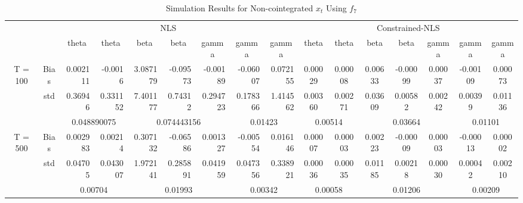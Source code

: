 \documentclass[a4paper,12pt,times,numbered,print,index]{report}
\numberwithin{equation}{section}
\begin{document}
\begin{table}[htbp]
	\centering
	\caption{Simulation Results for Non-cointegrated $x_t$ Using $f_7$}
	\begin{adjustbox}{max width=\textwidth}
	\begin{tabular}{cccccccccccccccc}
		\toprule
		& \multicolumn{8}{c}{NLS}                                       & \multicolumn{7}{c}{Constrained-NLS} \\
		&       & theta & theta & beta  & beta  & gamma & gamma & gamma & theta & theta & beta  & beta  & gamma & gamma & gamma \\
		\midrule
		\multirow{3}[1]{*}{T = 100} & Bias  & \multicolumn{1}{r}{0.002111} & \multicolumn{1}{r}{-0.0016} & \multicolumn{1}{r}{3.087179} & \multicolumn{1}{r}{-0.09573} & \multicolumn{1}{r}{-0.00189} & \multicolumn{1}{r}{-0.06007} & \multicolumn{1}{r}{\textcolor[rgb]{ 0,  .439,  .753}{0.072155}} & 0.00029 & 0.00008 & 0.00633 & -0.00099 & 0.00037 & -0.00109 & \textcolor[rgb]{ 0,  .439,  .753}{0.00073} \\
		& std   & \multicolumn{1}{r}{0.36946} & \multicolumn{1}{r}{0.331152} & \multicolumn{1}{r}{7.401177} & \multicolumn{1}{r}{0.74312} & \multicolumn{1}{r}{0.294723} & \multicolumn{1}{r}{0.178366} & \multicolumn{1}{r}{1.414562} & 0.00360 & 0.00271 & 0.03609 & 0.00582 & 0.00242 & 0.00399 & 0.01136 \\
		&       & \multicolumn{2}{c}{0.048890075} & \multicolumn{3}{c}{0.074443156} & \multicolumn{2}{c}{0.01423} & \multicolumn{2}{c}{0.00514} & \multicolumn{3}{c}{0.03664} & \multicolumn{2}{c}{0.01101} \\
		\multirow{3}[0]{*}{T = 500} & Bias  & \multicolumn{1}{r}{0.002983} & \multicolumn{1}{r}{0.00214} & \multicolumn{1}{r}{0.307132} & \multicolumn{1}{r}{-0.06586} & \multicolumn{1}{r}{0.001327} & \multicolumn{1}{r}{-0.00554} & \multicolumn{1}{r}{\textcolor[rgb]{ 0,  .439,  .753}{0.016146}} & 0.00007 & 0.00003 & 0.00223 & -0.00009 & 0.00003 & -0.00013 & \textcolor[rgb]{ 0,  .439,  .753}{0.00002} \\
		& std   & \multicolumn{1}{r}{0.04705} & \multicolumn{1}{r}{0.043007} & \multicolumn{1}{r}{1.972141} & \multicolumn{1}{r}{0.285891} & \multicolumn{1}{r}{0.041959} & \multicolumn{1}{r}{0.047356} & \multicolumn{1}{r}{0.338921} & 0.00036 & 0.00035 & 0.01185 & 0.00218 & 0.00030 & 0.00042 & 0.00210 \\
		&       & \multicolumn{2}{c}{0.00704} & \multicolumn{3}{c}{0.01993} & \multicolumn{2}{c}{0.00342} & \multicolumn{2}{c}{0.00058} & \multicolumn{3}{c}{0.01206} & \multicolumn{2}{c}{0.00209} \\

\end{tabular}
\end{adjustbox}
\end{table}
\end{document}
